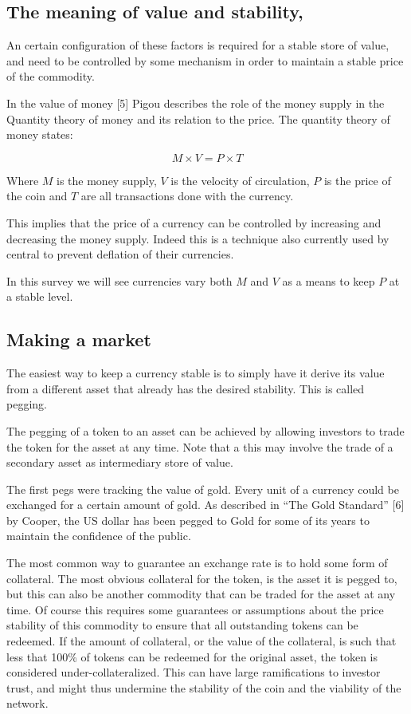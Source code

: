 \documentclass[english,]{IEEEtran}
\begin{document}
\hypertarget{the-meaning-of-value-and-stability}{%
\subsection{The meaning of value and
stability,}\label{the-meaning-of-value-and-stability}}

An certain configuration of these factors is required for a stable store
of value, and need to be controlled by some mechanism in order to
maintain a stable price of the commodity.

In the value of money {[}5{]} Pigou describes the role of the money
supply in the Quantity theory of money and its relation to the price.
The quantity theory of money states:

\[ M \times V = P \times T \]

Where \(M\) is the money supply, \(V\) is the velocity of circulation,
\(P\) is the price of the coin and \(T\) are all transactions done with
the currency.

This implies that the price of a currency can be controlled by
increasing and decreasing the money supply. Indeed this is a technique
also currently used by central to prevent deflation of their currencies.

In this survey we will see currencies vary both \(M\) and \(V\) as a
means to keep \(P\) at a stable level.

\hypertarget{making-a-market}{%
\subsection{Making a market}\label{making-a-market}}

The easiest way to keep a currency stable is to simply have it derive
its value from a different asset that already has the desired stability.
This is called pegging.

The pegging of a token to an asset can be achieved by allowing investors
to trade the token for the asset at any time. Note that a this may
involve the trade of a secondary asset as intermediary store of value.

The first pegs were tracking the value of gold. Every unit of a currency
could be exchanged for a certain amount of gold. As described in ``The
Gold Standard'' {[}6{]} by Cooper, the US dollar has been pegged to Gold
for some of its years to maintain the confidence of the public.

The most common way to guarantee an exchange rate is to hold some form
of collateral. The most obvious collateral for the token, is the asset
it is pegged to, but this can also be another commodity that can be
traded for the asset at any time. Of course this requires some
guarantees or assumptions about the price stability of this commodity to
ensure that all outstanding tokens can be redeemed. If the amount of
collateral, or the value of the collateral, is such that less that 100\%
of tokens can be redeemed for the original asset, the token is
considered under-collateralized. This can have large ramifications to
investor trust, and might thus undermine the stability of the coin and
the viability of the network.
\end{document}
